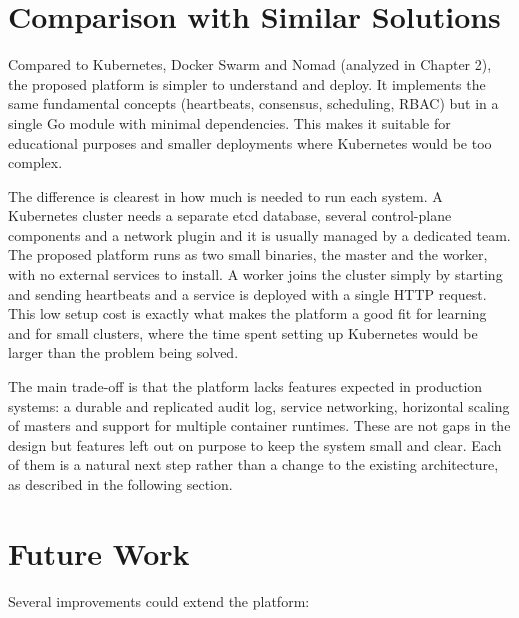 \section{Comparison with Similar Solutions}

Compared to Kubernetes, Docker Swarm and Nomad (analyzed in Chapter 2), the proposed platform is simpler to understand and deploy. It implements the same fundamental concepts (heartbeats, consensus, scheduling, RBAC) but in a single Go module with minimal dependencies. This makes it suitable for educational purposes and smaller deployments where Kubernetes would be too complex.

The difference is clearest in how much is needed to run each system. A Kubernetes cluster needs a separate etcd database, several control-plane components and a network plugin and it is usually managed by a dedicated team. The proposed platform runs as two small binaries, the master and the worker, with no external services to install. A worker joins the cluster simply by starting and sending heartbeats and a service is deployed with a single HTTP request. This low setup cost is exactly what makes the platform a good fit for learning and for small clusters, where the time spent setting up Kubernetes would be larger than the problem being solved.

The main trade-off is that the platform lacks features expected in production systems: a durable and replicated audit log, service networking, horizontal scaling of masters and support for multiple container runtimes. These are not gaps in the design but features left out on purpose to keep the system small and clear. Each of them is a natural next step rather than a change to the existing architecture, as described in the following section.

\section{Future Work}

Several improvements could extend the platform:

